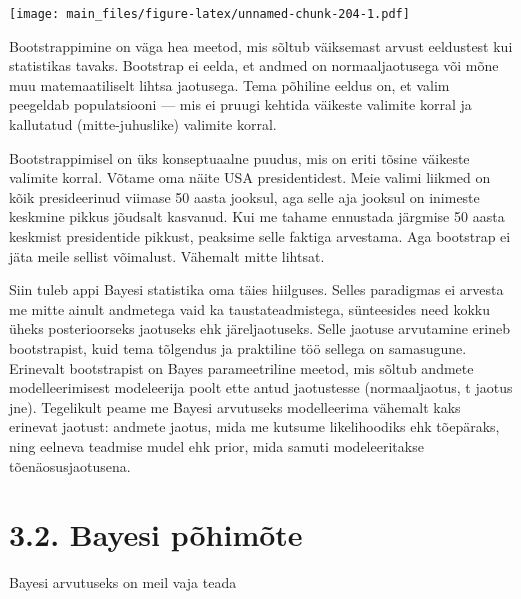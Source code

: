 \documentclass[]{book}
\begin{document}
\texttt{[image: main\_files/figure-latex/unnamed-chunk-204-1.pdf]}

Bootstrappimine on väga hea meetod, mis sõltub väiksemast arvust
eeldustest kui statistikas tavaks. Bootstrap ei eelda, et andmed on
normaaljaotusega või mõne muu matemaatiliselt lihtsa jaotusega. Tema
põhiline eeldus on, et valim peegeldab populatsiooni --- mis ei pruugi
kehtida väikeste valimite korral ja kallutatud (mitte-juhuslike)
valimite korral.

Bootstrappimisel on üks konseptuaalne puudus, mis on eriti tõsine
väikeste valimite korral. Võtame oma näite USA presidentidest. Meie
valimi liikmed on kõik presideerinud viimase 50 aasta jooksul, aga selle
aja jooksul on inimeste keskmine pikkus jõudsalt kasvanud. Kui me tahame
ennustada järgmise 50 aasta keskmist presidentide pikkust, peaksime
selle faktiga arvestama. Aga bootstrap ei jäta meile sellist võimalust.
Vähemalt mitte lihtsat.

Siin tuleb appi Bayesi statistika oma täies hiilguses. Selles paradigmas
ei arvesta me mitte ainult andmetega vaid ka taustateadmistega,
sünteesides need kokku üheks posterioorseks jaotuseks ehk
järeljaotuseks. Selle jaotuse arvutamine erineb bootstrapist, kuid tema
tõlgendus ja praktiline töö sellega on samasugune. Erinevalt
bootstrapist on Bayes parameetriline meetod, mis sõltub andmete
modelleerimisest modeleerija poolt ette antud jaotustesse
(normaaljaotus, t jaotus jne). Tegelikult peame me Bayesi arvutuseks
modelleerima vähemalt kaks erinevat jaotust: andmete jaotus, mida me
kutsume likelihoodiks ehk tõepäraks, ning eelneva teadmise mudel ehk
prior, mida samuti modeleeritakse tõenäosusjaotusena.

\section{3.2. Bayesi põhimõte}\label{bayesi-pohimote}

Bayesi arvutuseks on meil vaja teada
\end{document}
